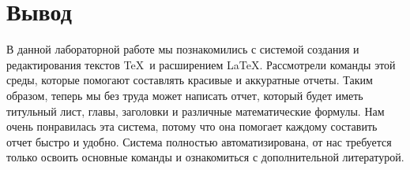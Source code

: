 \documentclass[10pt,a4paper]{report}
\begin{document}
\chapter{Вывод}
В данной лабораторной работе мы познакомились  с системой создания и редактирования текстов \TeX\ и расширением \LaTeX. Рассмотрели команды этой среды, которые помогают составлять красивые и аккуратные отчеты.
Таким образом, теперь мы без труда может написать отчет, который будет иметь титульный лист, главы, заголовки и различные математические формулы. Нам очень понравилась эта система, потому что она помогает каждому составить отчет быстро и удобно. Система полностью автоматизирована, от нас требуется только освоить основные команды и ознакомиться с дополнительной литературой.
\end{document}
